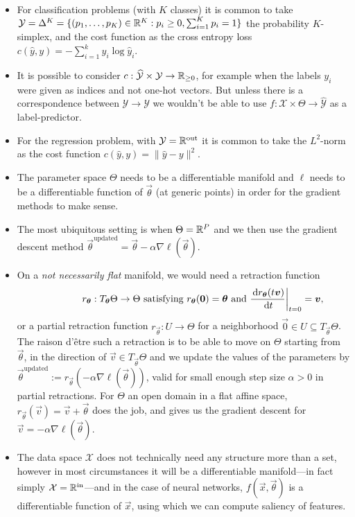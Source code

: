 \documentclass[12pt]{amsart}
\newcommand{\calX}{\mathcal{X}}
\newcommand{\calY}{\mathcal{Y}}
\begin{document}
\begin{itemize}
\item For classification problems (with $K$ classes) it is common to take $\mathcal{Y} =  \Delta^K = \{(p_1, \ldots, p_K) \in \mathbb{R}^K : p_i \geq 0, \sum_{i = 1}^K p_i = 1\}$ the probability $K$-simplex, and the cost function as the cross entropy loss $c(\hat y, y) = - \sum_{i = 1}^k y_i \log \hat y_i$.
\item It is possible to consider $c : \widehat{\calY} \times \calY \to \R_{\geq 0}$, for example when the labels $y_i$ were given as indices and not one-hot vectors. But unless there is a correspondence between $\widehat{\calY} \rightarrow  \calY$ we wouldn't be able to use $f: \calX \times \Theta \to \widehat{\calY}$ as a label-predictor.
\item For the regression problem, with $\calY = \R^{\text{out}}$ it is common to take the $L^2$-norm as the cost function $c(\hat y, y) = \|\hat y - y\|^2$.
\item The parameter space $\Theta$ needs to be a differentiable manifold and $\ell$ needs to be a differentiable function of $\vec{\theta}$ (at generic points) in order for the gradient methods to make sense. 
\item The most ubiquitous setting is when $\Theta = \mathbb{R}^P$ and we then use the gradient descent method  $\vec{\theta}^{\text{updated}} = \vec{\theta} - \alpha \nabla \ell(\vec \theta)$. 
\item On a \emph{not necessarily flat} manifold, we would need a retraction function
\[
	\qquad \qquad r_{\mathbf{\boldsymbol{\theta}}} : T_{\mathbf{\boldsymbol{\theta}}} \Theta \to \Theta  \text{ satisfying } r_{\mathbf{\boldsymbol{\theta}}}(\mathbf{\boldsymbol{0}}) = \mathbf{\boldsymbol{\theta}} \text{ and } \frac{\,\mathrm{d} r_{\mathbf{\boldsymbol{\theta}}}(t \mathbf{\boldsymbol{v}})} {\,\mathrm{d} t}\bigg|_{t = 0} = \mathbf{\boldsymbol{v}},
\]
or a partial retraction function $r_{\vec{\theta}}: U \to \Theta$ for a neighborhood $\vec{0} \in U \subseteq T_{\vec{\theta}}\Theta$. The raison d'\^{e}tre such a retraction is to be able to move on $\Theta$ starting from $\vec{\theta}$, in the direction of $\vec{v}\in T_\vec{\theta} \Theta$ and we update the values of the parameters by $\vec\theta^{\text{updated}} := r_\vec{\theta}(- \alpha \nabla \ell(\vec{\theta}))$, valid for small enough step size $\alpha>0$ in partial retractions. For $\Theta$ an open domain in a flat affine space, $r_{\vec{\theta}} (\vec{v}) = \vec{v} + \vec{\theta}$ does the job, and gives us the gradient descent for $\vec{v} = -\alpha \nabla\ell(\vec{\theta})$.
\item The data space $\calX$ does not technically need any structure more than a set, however in most circumstances it will be a differentiable manifold---in fact simply $\calX = \R^{\text{in}}$---and in the case of neural networks, $f(\vec{x}, \vec{\theta})$ is a differentiable function of $\vec{x}$, using which we can compute saliency of features.

\end{itemize}
\end{document}
